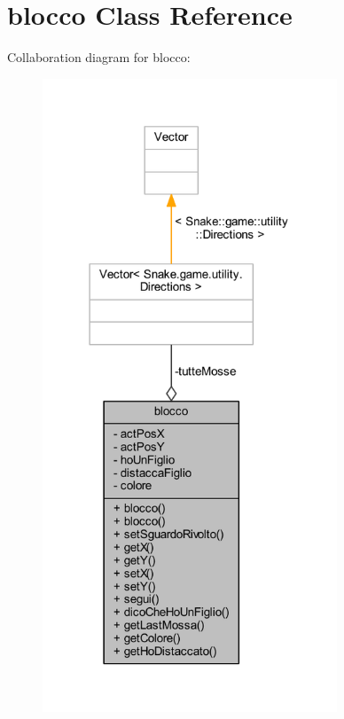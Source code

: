 \hypertarget{class_snake_1_1game_1_1vipera_1_1blocco}{}\section{blocco Class Reference}
\label{class_snake_1_1game_1_1vipera_1_1blocco}


Collaboration diagram for blocco\+:
\nopagebreak
\begin{figure}[H]
\begin{center}
\leavevmode
\includegraphics[width=249pt]{class_snake_1_1game_1_1vipera_1_1blocco__coll__graph}
\end{center}
\end{figure}
